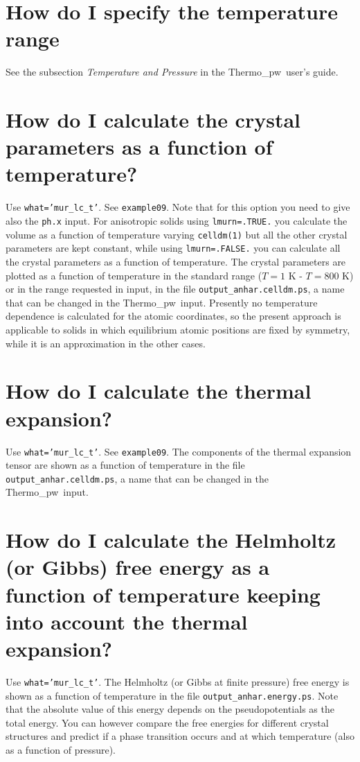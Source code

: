 \documentclass[12pt,a4paper,twoside]{report}
\def\thermo{{\sc Thermo}\_{\sc pw}}
\begin{document}
\newpage
{\color{coral}\section{How do I specify the temperature range}} 
\color{black}
See the subsection {\it Temperature and Pressure} in the 
\thermo\ user's guide. 

\newpage
{\color{coral}\section{How do I calculate the crystal parameters as a function
of temperature?}}
\color{black}
Use \texttt{what='mur\_lc\_t'}. See \texttt{example09}. Note that
for this option you need to give also the \texttt{ph.x} input.
For anisotropic solids using \texttt{lmurn=.TRUE.} you calculate 
the volume as a function of temperature varying \texttt{celldm(1)} 
but all the other crystal parameters are kept constant, while
using \texttt{lmurn=.FALSE.} you can calculate all the crystal
parameters as a function of temperature.
The crystal parameters are plotted as a function of temperature
in the standard range ($T=1$ K - $T=800$ K) or in the range  
requested in input, in the file 
\texttt{output\_anhar.celldm.ps}, a name that can be changed in the \thermo\ input.
Presently no temperature dependence is calculated 
for the atomic coordinates, so the present approach is applicable
to solids in which equilibrium atomic positions are fixed by 
symmetry, while it is an approximation in the other cases.

\newpage
{\color{coral}\section{How do I calculate the thermal expansion?}}
\color{black}
Use \texttt{what='mur\_lc\_t'}. See \texttt{example09}. The components
of the thermal expansion tensor are shown as a function of temperature 
in the file \texttt{output\_anhar.celldm.ps}, a name that can be changed in 
the \thermo\ input.

\newpage
{\color{coral}\section{How do I calculate the Helmholtz (or Gibbs) free energy
as a function of temperature keeping into account the thermal expansion?}}
\color{black}
Use \texttt{what='mur\_lc\_t'}. The Helmholtz (or Gibbs at finite pressure) 
free energy is shown as a function of temperature in the file 
\texttt{output\_anhar.energy.ps}. Note that the absolute value of this energy
depends on the pseudopotentials as the total energy. You can however
compare the free energies for different crystal structures 
and predict if a phase transition occurs and at which temperature (also 
as a function of pressure).
\end{document}

